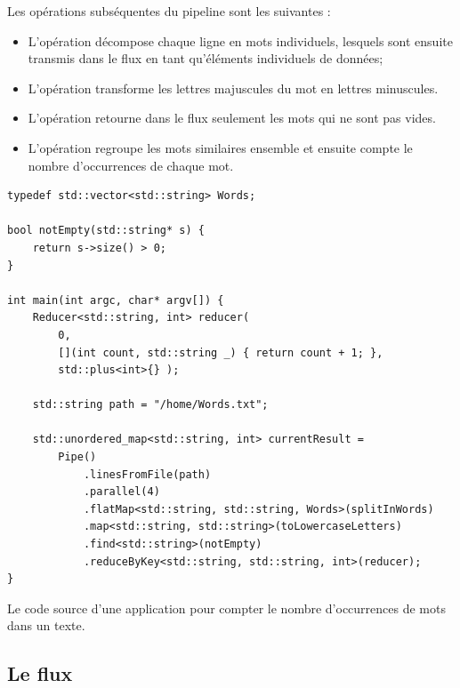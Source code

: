 Les op\'erations subs\'equentes du pipeline sont les suivantes :
\begin{itemize}

\item L'op\'eration  d\'ecompose chaque ligne en mots individuels, lesquels sont ensuite transmis dans le flux en tant qu'\'el\'ements individuels de donn\'ees; 

\item L'op\'eration  transforme les lettres majuscules du mot en lettres minuscules.

\item L'op\'eration  retourne dans le flux seulement les mots qui ne sont pas vides.



\item L'op\'eration   regroupe les mots similaires ensemble et ensuite compte le nombre d'occurrences de chaque mot. 
\end{itemize}


\begin{Listing}[tbp]
\begin{lstlisting}
typedef std::vector<std::string> Words;

bool notEmpty(std::string* s) {
    return s->size() > 0;
}

int main(int argc, char* argv[]) {
    Reducer<std::string, int> reducer(
        0, 
    	[](int count, std::string _) { return count + 1; },
        std::plus<int>{} );

   	std::string path = "/home/Words.txt"; 

	std::unordered_map<std::string, int> currentResult = 
		Pipe()
			.linesFromFile(path) 
			.parallel(4)
			.flatMap<std::string, std::string, Words>(splitInWords)
			.map<std::string, std::string>(toLowercaseLetters)
			.find<std::string>(notEmpty)
			.reduceByKey<std::string, std::string, int>(reducer);
}
\end{lstlisting}
\caption{Le code source d'une application pour compter le nombre d'occurrences de mots dans un texte.}
\label{wordcount.c++}
\end{Listing}


\subsection{Le flux}


